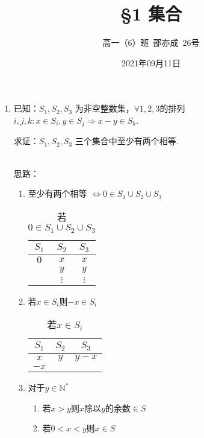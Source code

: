 \documentclass[8pt]{article}
\title{\S 1 集合}
\author{高一（6）班\ 邵亦成\ 26号}
\date{2021年09月11日}
\begin{document}
	\maketitle

	\begin{enumerate}
		\item

			已知：$S_1, S_2, S_3$ 为非空整数集，$\forall 1, 2, 3$的排列$i, j, k : x \in S_i, y \in S_j \Rightarrow x-y \in S_k$.

			求证：$S_1, S_2, S_3$ 三个集合中至少有两个相等.

			~\\
			思路：

			\begin{enumerate}[ (i) ]
				\item
					至少有两个相等 $\Leftrightarrow 0\in S_1 \cup S_2 \cup S_3$

					\begin{table}[h]
						\centering
						\begin{tabular}{|c|c|c|}
							\hline $S_1$&$S_2$&$S_3$\\
							\hline $0$&$x$&$x$\\
							\hline &$y$&$y$\\
							\hline &$\vdots$&$\vdots$\\
							\hline
						\end{tabular}
						\caption{若 $0 \in S_1 \cup S_2 \cup S_3$}
					\end{table}

				\item

					若$x\in S_i$则$-x \in S_i$

					\begin{table}[h]
						\centering
						\begin{tabular}{|c|c|c|}
							\hline $S_1$&$S_2$&$S_3$\\
							\hline $x$&$y$&$y-x$\\
							\hline $-x$&&\\
							\hline
						\end{tabular}
						\caption{若$x \in S_i$}
					\end{table}

				\item

					对于$y \in \mathbb{N}^*$
					\begin{enumerate}[ i) ]
						\item
							若$x>y$则$x$除以$y$的余数$\in S$
						\item
							若$0<x<y$则$x \in S$
					\end{enumerate}


\end{enumerate}
\end{enumerate}
\end{document}
